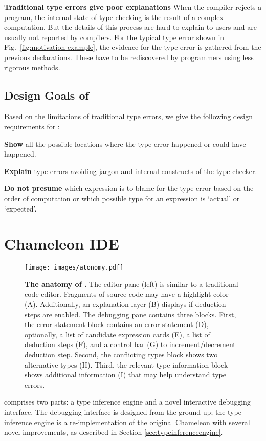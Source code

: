 \textbf{Traditional type errors give poor explanations}
When the compiler rejects a program, the internal state of type checking is the result of a complex computation. But the details of this process are hard to explain to users and are usually not reported by compilers. For the typical type error shown in Fig.~\ref{fig:motivation-example}, the evidence for the type error is gathered from the previous declarations. These have to be rediscovered by programmers using less rigorous methods. 

\subsection{Design Goals of \chameleon{}}
Based on the limitations of traditional type errors, we give the following design requirements for \chameleon{}:

\noindent\textbf{Show} all the possible locations where the type error happened or could have happened.

\noindent\textbf{Explain} type errors avoiding jargon and internal constructs of the type checker.

\noindent\textbf{Do not presume} which expression is to blame for the type error based on the order of computation or which possible type for an expression is `actual' or `expected'.


\section{Chameleon IDE} \label{chameleon}
\begin{figure*}
    \centering
    \texttt{[image: images/atonomy.pdf]}
    \caption{
        \textbf{The anatomy of \chameleon{}.}
        The editor pane (left) is similar to a traditional code editor. Fragments of source code may have a highlight
        color (A). Additionally, an explanation layer (B) displays if deduction steps are enabled. The debugging pane contains three blocks. First, the error statement block contains an error statement (D), optionally, a list of candidate expression cards (E), a list of deduction steps (F), and a control bar (G) to increment/decrement deduction step. Second, the conflicting types block shows two alternative types (H). Third, the relevant type information block shows additional information (I) that may help understand type errors.
    }
    \label{fig:anatomy}
\end{figure*}


\chameleon{} comprises two parts: a type inference engine and a novel interactive debugging interface. 
The debugging interface is designed from the ground up; the type inference engine is a re-implementation of the original Chameleon with several novel improvements, as described in Section \ref{sec:typeinferenceengine}.

